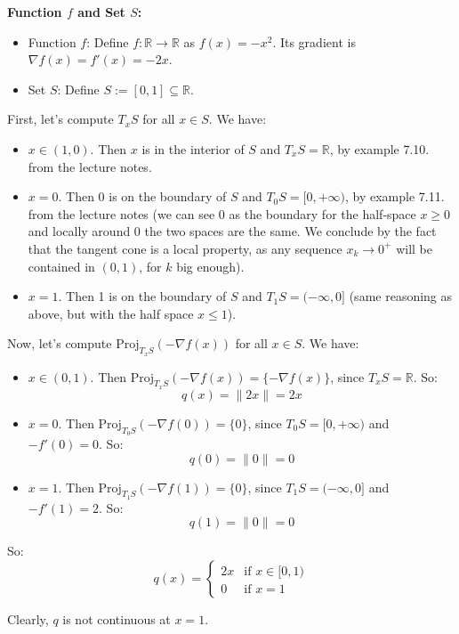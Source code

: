 \documentclass[12p]{article}
\begin{document}
\textbf{Function \( f \) and Set \( S \):}
\begin{itemize}
    \item Function \( f \): Define \( f: \mathbb{R} \rightarrow \mathbb{R} \) as \( f(x) = -x^2 \). Its gradient is \( \nabla f(x)=f'(x) = -2x \).
    \item Set \( S \): Define \( S := [0,1]\subseteq\mathbb{R}\).
\end{itemize}
First, let's compute \(T_xS\) for all \(x\in S\). We have: 
\begin{itemize}
    \item \(x\in(1,0)\). Then \(x\) is in the interior of \(S\) and \(T_xS=\mathbb{R}\), by example 7.10. from the lecture notes. 
    \item \(x=0\). Then 0 is on the boundary of \(S\) and \(T_0S=[0,+\infty)\), by example 7.11. from the lecture notes (we can see 0 as the boundary for the half-space \(x\geq 0\) and locally around 0 the two spaces are the same. We conclude by the fact that the tangent cone is a local property, as any sequence \(x_k\to 0^+\) will be contained in \((0,1)\), for \(k\) big enough). 
    \item \(x=1\). Then 1 is on the boundary of \(S\) and \(T_1S=(-\infty,0]\) (same reasoning as above, but with the half space \(x\leq 1\)).

\end{itemize}
Now, let's compute \(\text{Proj}_{T_xS}(-\nabla f(x))\) for all \(x\in S\). We have:
\begin{itemize}
    \item \(x\in(0,1)\). Then \(\text{Proj}_{T_xS}(-\nabla f(x))=\{-\nabla f(x)\}\), since \(T_xS=\mathbb{R}\). So:
    \[
        q(x)=\|2x\|=2x
    \]
    \item \(x=0\). Then \(\text{Proj}_{T_0S}(-\nabla f(0))=\{0\}\), since \(T_0S=[0,+\infty)\) and \(-f'(0)=0\). So:
    \[
        q(0)=\|0\|=0    
    \]
    \item \(x=1\). Then \(\text{Proj}_{T_1S}(-\nabla f(1))=\{0\}\), since \(T_1S=(-\infty,0]\) and \(-f'(1)=2\). So:
    \[
        q(1)=\|0\|=0    
    \]

\end{itemize}

So:
\[
        q(x)=\begin{cases}
            2x & \text{if } x\in[0,1)\\
            0 & \text{if }  x=1
        \end{cases}    
\]

Clearly, \(q\) is not continuous at \(x=1\).
\end{document}
